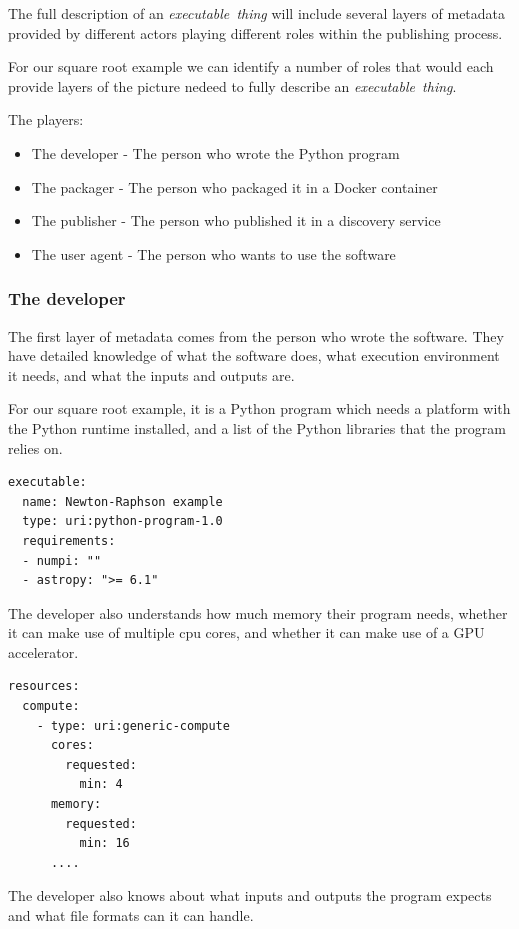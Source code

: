 \documentclass[11pt,a4paper]{ivoa}
\newcommand{\executablething}[1] {\textit{executable~thing#1}}
\newcommand{\python} {Python}
\newcommand{\pythonprogram} {Python program}
\newcommand{\dockercontainer} {Docker container}
\newcommand{\gpu}[1] {GPU#1}
\begin{document}
The full description of an \executablething{} will include several layers of metadata
provided by different actors playing different roles within the publishing process.

For our square root example we can identify a number of roles that would each provide
layers of the picture nedeed to fully describe an \executablething{}.

The players:
\begin{itemize}
    \item The developer  - The person who wrote the \pythonprogram{}
    \item The packager   - The person who packaged it in a \dockercontainer{}
    \item The publisher  - The person who published it in a discovery service
    \item The user agent - The person who wants to use the software
\end{itemize}

\subsubsection{The developer}
\label{subsub-software-developer}

The first layer of metadata comes from the person who wrote the software.
They have detailed knowledge of what the software does, what execution environment it needs,
and what the inputs and outputs are.

For our square root example, it is a \pythonprogram{} which needs a platform with the \python{} runtime installed,
and a list of the \python{} libraries that the program relies on.

\begin{lstlisting}[]
executable:
  name: Newton-Raphson example
  type: uri:python-program-1.0
  requirements:
  - numpi: ""
  - astropy: ">= 6.1"
\end{lstlisting}

The developer also understands how much memory their program needs, whether it can make use of multiple cpu cores,
and whether it can make use of a \gpu{} accelerator.

\begin{lstlisting}[]
resources:
  compute:
    - type: uri:generic-compute
      cores:
        requested:
          min: 4
      memory:
        requested:
          min: 16
      ....
\end{lstlisting}

The developer also knows about what inputs and outputs the program expects and what file
formats can it can handle.
\end{document}
